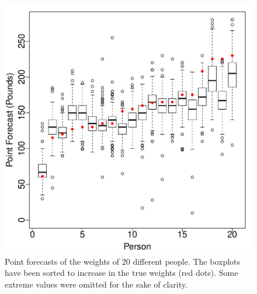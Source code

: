 \documentclass[11pt]{article}
\theoremstyle{definition}
\theoremstyle{definition}
\begin{document}
\begin{figure}[t!]
\begin{minipage}[t]{.5\textwidth}
                \includegraphics[width=\textwidth]{Weights}
                \caption{Point forecasts of the weights of $20$ different people. The boxplots have been sorted to increase in the true weights (red dots). Some extreme values were omitted for the sake of clarity.}
                                \label{Example_point}
        
\end{minipage}%
\end{figure}
\end{document}
